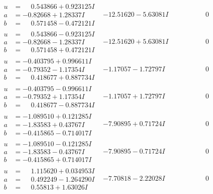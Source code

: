 \documentclass[1p]{elsarticle_modified}
\theoremstyle{definition}
\begin{document}
$$\begin{array}{c|c|c}
\begin{aligned}
u &= \phantom{-}0.543866 + 0.923125 I \\
a &= -0.82668 + 1.28337 I \\
b &= \phantom{-}0.571458 - 0.472121 I\end{aligned}
 & -12.51620 - 5.63081 I & \phantom{-0.000000 } 0 \\ \hline\begin{aligned}
u &= \phantom{-}0.543866 - 0.923125 I \\
a &= -0.82668 - 1.28337 I \\
b &= \phantom{-}0.571458 + 0.472121 I\end{aligned}
 & -12.51620 + 5.63081 I & \phantom{-0.000000 } 0 \\ \hline\begin{aligned}
u &= -0.403795 + 0.996611 I \\
a &= -0.79352 - 1.17354 I \\
b &= \phantom{-}0.418677 + 0.887734 I\end{aligned}
 & -1.17057 - 1.72797 I & \phantom{-0.000000 } 0 \\ \hline\begin{aligned}
u &= -0.403795 - 0.996611 I \\
a &= -0.79352 + 1.17354 I \\
b &= \phantom{-}0.418677 - 0.887734 I\end{aligned}
 & -1.17057 + 1.72797 I & \phantom{-0.000000 } 0 \\ \hline\begin{aligned}
u &= -1.089510 + 0.121285 I \\
a &= -1.83583 + 0.43767 I \\
b &= -0.415865 - 0.714017 I\end{aligned}
 & -7.90895 + 0.71724 I & \phantom{-0.000000 } 0 \\ \hline\begin{aligned}
u &= -1.089510 - 0.121285 I \\
a &= -1.83583 - 0.43767 I \\
b &= -0.415865 + 0.714017 I\end{aligned}
 & -7.90895 - 0.71724 I & \phantom{-0.000000 } 0 \\ \hline\begin{aligned}
u &= \phantom{-}1.115620 + 0.034953 I \\
a &= \phantom{-}0.492249 - 1.264290 I \\
b &= \phantom{-}0.55813 + 1.63026 I\end{aligned}
 & -7.70818 - 2.22028 I & \phantom{-0.000000 } 0 \\ \hline\begin{aligned}

\end{aligned}
\end{array}$$
\end{document}

